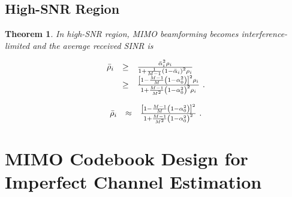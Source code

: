 \documentclass[a4paper,10pt,fleqn, twocolumn]{IEEEtran}
\newtheorem{theorem}{Theorem}
\begin{document}
\subsection{High-SNR Region}
\begin{theorem} In high-SNR region, MIMO beamforming becomes interference-limited and the average received SINR
is

\begin{equation}\hspace{-0.0in}
\begin{array}{rcl}
 \bar\rho_{i}&\geq&\frac{\bar\alpha_{i}^{2}\rho_{i}}{1+
\frac{1}{M-1}\left(1-\bar\alpha_{i}\right)^{2}\rho_{i}}\\
&\geq&\frac{\left[1-\frac{M-1}{M}\left(1-\alpha_{0}^2\right)\right]^2\rho_{i}}{1+
\frac{M-1}{M^2}\left(1-\alpha_{0}^2\right)^{2}\rho_{i}}\ .
\end{array}
\end{equation}

\begin{equation}\hspace{-0.0in}
\begin{array}{rcl}
\bar\rho_{i}&\approx&\frac{\left[1-\frac{M-1}{M}\left(1-\alpha_{0}^2\right)\right]^2}{1+
\frac{M-1}{M^2}\left(1-\alpha_{0}^2\right)^{2}}\ .
\end{array}
\end{equation}



\end{theorem}

\begin{figure}
\end{figure}

\section{MIMO Codebook Design for Imperfect Channel Estimation}
\end{document}
